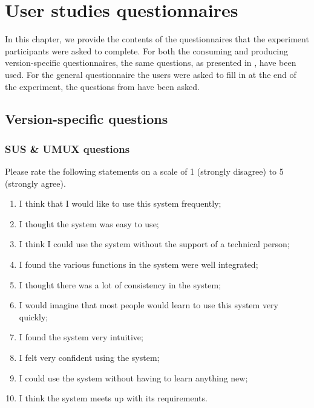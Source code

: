 \chapter{User studies questionnaires}

In this chapter, we provide the contents of the questionnaires that the experiment participants were asked to complete. For both the consuming and producing version-specific questionnaires, the same questions, as presented in , have been used. For the general questionnaire the users were asked to fill in at the end of the experiment, the questions from  have been asked.



\section{Version-specific questions}


\subsection*{SUS \& UMUX questions}
Please rate the following statements on a scale of 1 (strongly disagree) to 5 (strongly agree).
\begin{enumerate}
\item I think that I would like to use this system frequently;
\item I thought the system was easy to use;
\item I think I could use the system without the support of a technical person;
\item I found the various functions in the system were well integrated;
\item I thought there was a lot of consistency in the system;
\item I would imagine that most people would learn to use this system very quickly;
\item I found the system very intuitive;
\item I felt very confident using the system;
\item I could use the system without having to learn anything new;
\item I think the system meets up with its requirements.
\end{enumerate}


